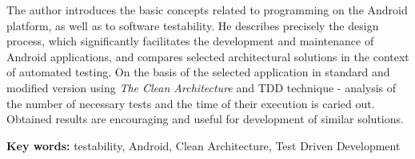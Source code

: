 The author introduces the basic concepts related to programming on the Android platform, as well as to software testability. He describes precisely the design process, which significantly facilitates the development and maintenance of Android applications, and compares selected architectural solutions in the context of automated testing. On the basis of the selected application in standard and modified version using \textit{The Clean Architecture} and TDD technique -  analysis of the number of necessary tests and the time of their execution is caried out. Obtained results are encouraging and useful for development of similar solutions.
\vspace{7 pt}

\textbf{Key words:} testability, Android, Clean Architecture, Test Driven Development


